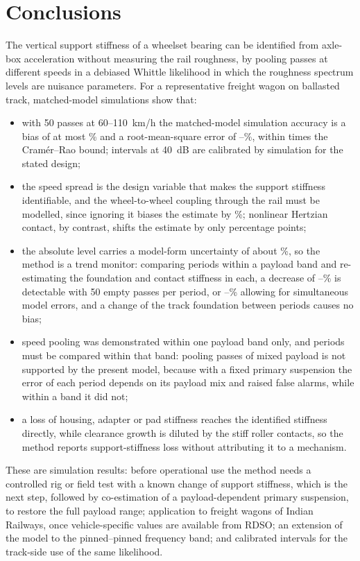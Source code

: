 \section{Conclusions}\label{sec:conclusions}
The vertical support stiffness of a wheelset bearing can be identified from axle-box acceleration
without measuring the rail roughness, by pooling passes at different speeds
in a debiased Whittle likelihood in which the roughness spectrum levels are nuisance parameters. For a
representative freight wagon on ballasted track, matched-model simulations show that:
\begin{itemize}
\item with 50 passes at 60--110~km/h the matched-model simulation accuracy is a bias of at most
  \HLBiasAbsMax\% and a root-mean-square error of \HLRMSEMin--\HLRMSEMax\%, within \HLRatioCRBMax{}
  times the Cram\'er--Rao bound; intervals at 40~dB are calibrated by simulation for the stated design;
\item the speed spread is the design variable that makes the support stiffness identifiable, and the
  wheel-to-wheel coupling through the rail must be modelled, since ignoring it biases the estimate by
  \IgnoreCouplingForty\%; nonlinear Hertzian contact, by contrast, shifts the estimate by only
  \ICDiffMean{} percentage points;
\item the absolute level carries a model-form uncertainty of about \BudgetCoestInt\%, so the method is a
  trend monitor: comparing periods within a payload band and re-estimating the foundation and contact
  stiffness in each, a decrease of \BandEmptyMDCFiftyMin--\BandEmptyMDCFiftyMax\% is detectable with 50
  empty passes per period, or \BandEmptyMDCFiftyConsMin--\BandEmptyMDCFiftyConsMax\% allowing for
  simultaneous model errors, and a change of the track foundation between periods causes no bias;
\item speed pooling was demonstrated within one payload band only, and periods must be compared
  within that band: pooling passes of mixed payload is not supported by the present model, because with a fixed primary suspension the error of each period
  depends on its payload mix and raised false alarms, while within a band it did not;
\item a loss of housing, adapter or pad stiffness reaches the identified stiffness directly, while
  clearance growth is diluted by the stiff roller contacts, so the method reports support-stiffness
  loss without attributing it to a mechanism.
\end{itemize}
These are simulation results: before operational use the method needs a controlled rig or field test with
a known change of support stiffness, which is the next step, followed by co-estimation of a payload-dependent
primary suspension, to restore the full payload range; application to
freight wagons of Indian Railways, once vehicle-specific values are available from RDSO; an extension of
the model to the pinned--pinned frequency band; and calibrated intervals for the track-side use of the
same likelihood.
